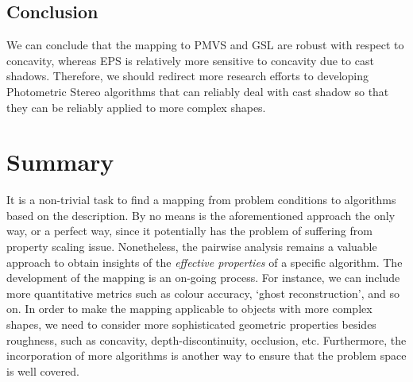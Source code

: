\subsection{Conclusion}
We can conclude that the mapping to PMVS and GSL are robust with respect to concavity, whereas EPS is relatively more sensitive to concavity due to cast shadows. Therefore, we should redirect more research efforts to developing Photometric Stereo algorithms that can reliably deal with cast shadow so that they can be reliably applied to more complex shapes.


\section{Summary}
It is a non-trivial task to find a mapping from problem conditions to algorithms based on the description. By no means is the aforementioned approach the only way, or a perfect way, since it potentially has the problem of suffering from property scaling issue. Nonetheless, the pairwise analysis remains a valuable approach to obtain insights of the \textit{effective properties} of a specific algorithm. The development of the mapping is an on-going process. For instance, we can include more quantitative metrics such as colour accuracy, `ghost reconstruction', and so on. In order to make the mapping applicable to objects with more complex shapes, we need to consider more sophisticated geometric properties besides roughness, such as concavity, depth-discontinuity, occlusion, etc. Furthermore, the incorporation of more algorithms is another way to ensure that the problem space is well covered.